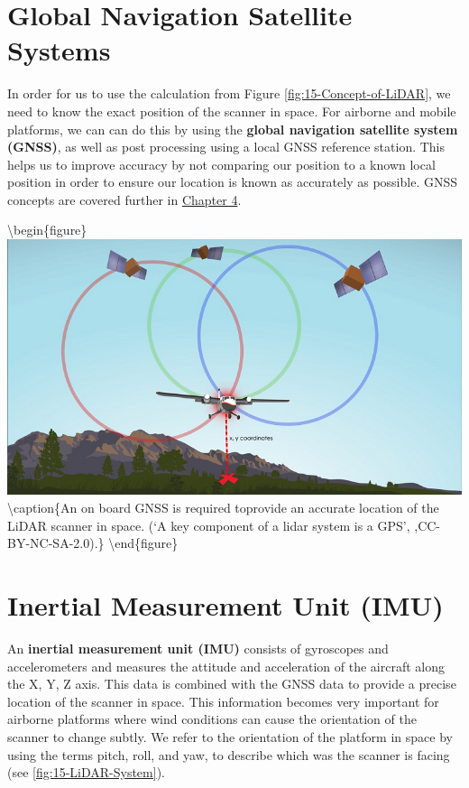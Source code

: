 \documentclass[
]{book}
\begin{document}
\hypertarget{global-navigation-satellite-systems}{%
\section{Global Navigation Satellite Systems}\label{global-navigation-satellite-systems}}

In order for us to use the calculation from Figure \ref{fig:15-Concept-of-LiDAR}, we need to know the exact position of the scanner in space. For airborne and mobile platforms, we can can do this by using the \textbf{global navigation satellite system (GNSS)}, as well as post processing using a local GNSS reference station. This helps us to improve accuracy by not comparing our position to a known local position in order to ensure our location is known as accurately as possible. GNSS concepts are covered further in \href{https://ubc-geomatics-textbook.github.io/geomatics-textbook/collecting-and-editing-data.html}{Chapter 4}.

\textbackslash begin\{figure\}
\includegraphics[width=0.7\linewidth]{images/15-XYZ-coordinates} \textbackslash caption\{An on board GNSS is required toprovide an accurate location of the LiDAR scanner in space. (`A key component of a lidar system is a GPS', \citet{neon_education_key_2014},CC-BY-NC-SA-2.0).\}\label{fig:15-XYZ-coordinates}
\textbackslash end\{figure\}

\hypertarget{inertial-measurement-unit-imu}{%
\section{Inertial Measurement Unit (IMU)}\label{inertial-measurement-unit-imu}}

An \textbf{inertial measurement unit (IMU)} consists of gyroscopes and accelerometers and measures the attitude and acceleration of the aircraft along the X, Y, Z axis. This data is combined with the GNSS data to provide a precise location of the scanner in space. This information becomes very important for airborne platforms where wind conditions can cause the orientation of the scanner to change subtly. We refer to the orientation of the platform in space by using the terms pitch, roll, and yaw, to describe which was the scanner is facing (see \ref{fig:15-LiDAR-System}).
\end{document}
